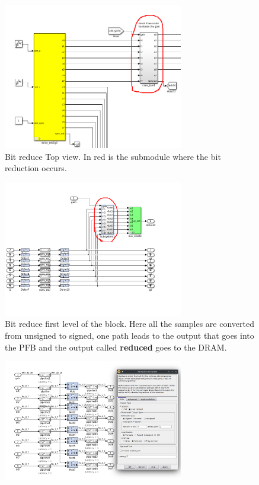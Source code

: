 \begin{enumerate}
    \begin{figure}
        \centering
        \includegraphics[width=0.7\textwidth]{images/adc_and_gain.png}
        \caption{Bit reduce Top view. In red is the submodule where the bit reduction occurs.}
        \label{fig:gain_block}
    \end{figure}
    \begin{figure}
        \centering
        \includegraphics[width=0.7\textwidth]{images/adc_gain1.png}
        \caption{Bit reduce first level of the block. Here all the samples are converted from unsigned to signed, one path leads to the output that goes into the PFB and the output called \textbf{reduced} goes to the DRAM.}
        \label{fig:gain_block1}
    \end{figure}
    \begin{figure}
        \centering
        \includegraphics[width=0.7\textwidth]{images/adc_gain2.png}

\end{figure}
\end{enumerate}
